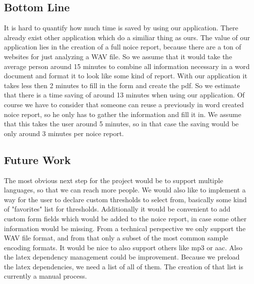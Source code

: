 \subsection{Bottom Line}
It is hard to quantify how much time is saved by using our application. There already exist other application which do a similiar thing as ours. The value of our application lies in the creation of a full noice report, because there are a ton of websites for just analyzing a WAV file. So we assume that it would take the average person around 15 minutes to combine all information necessary in a word document and format it to look like some kind of report. With our application it takes less then 2 minutes to fill in the form and create the pdf. So we estimate that there is a time saving of around 13 minutes when using our application. Of course we have to consider that someone can reuse a previously in word created noice report, so he only has to gather the information and fill it in. We assume that this takes the user around 5 minutes, so in that case the saving would be only around 3 minutes per noice report.

\subsection{Future Work}
The most obvious next step for the project would be to support multiple languages, so that we can reach more people. We would also like to implement a way for the user to declare custom thresholds to select from, basically some kind of "favorites" list for thresholds. Additionally it would be convenient to add custom form fields which would be added to the noice report, in case some other information would be missing. From a technical perspective we only support the WAV file format, and from that only a subset of the most common sample encoding formats. It would be nice to also support others like mp3 or aac. Also the latex dependency management could be improvement. Because we preload the latex dependencies, we need a list of all of them. The creation of that list is currently a manual process.